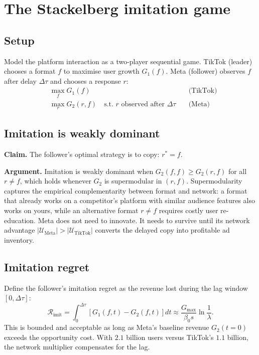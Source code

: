 \documentclass[12pt,a4paper]{article}
\begin{document}
\section{The Stackelberg imitation game}
\label{sec:stackelberg}

\subsection{Setup}

Model the platform interaction as a two-player sequential game. TikTok (leader) chooses a format $f$ to maximise user growth $G_1(f)$. Meta (follower) observes $f$ after delay $\Delta\tau$ and chooses a response $r$:
\begin{align}
  &\max_f G_1(f) \quad &\text{(TikTok)} \label{eq:leader} \\
  &\max_r G_2(r, f) \quad \text{s.t. } r \text{ observed after } \Delta\tau \quad &\text{(Meta)}
  \label{eq:follower}
\end{align}

\subsection{Imitation is weakly dominant}

\textbf{Claim.} The follower's optimal strategy is to copy: $r^* = f$.

\textbf{Argument.} Imitation is weakly dominant when $G_2(f, f) \geq G_2(r, f)$ for all $r \neq f$, which holds whenever $G_2$ is supermodular in $(r, f)$. Supermodularity captures the empirical complementarity between format and network: a format that already works on a competitor's platform with similar audience features also works on yours, while an alternative format $r \neq f$ requires costly user re-education. Meta does not need to innovate. It needs to survive until its network advantage $|\mathcal{U}_{\text{Meta}}| > |\mathcal{U}_{\text{TikTok}}|$ converts the delayed copy into profitable ad inventory.

\subsection{Imitation regret}

Define the follower's imitation regret as the revenue lost during the lag window $[0, \Delta\tau]$:
\begin{equation}
  \mathcal{R}_{\text{imit}} = \int_0^{\Delta\tau} \left[ G_1(f, t) - G_2(f, t) \right] dt \approx \frac{G_{\max}}{\beta_0 s} \ln\!\frac{1}{\lambda}.
  \label{eq:regret}
\end{equation}
This is bounded and acceptable as long as Meta's baseline revenue $G_2(t = 0)$ exceeds the opportunity cost. With $2.1$ billion users versus TikTok's $1.1$ billion, the network multiplier compensates for the lag.
\end{document}
